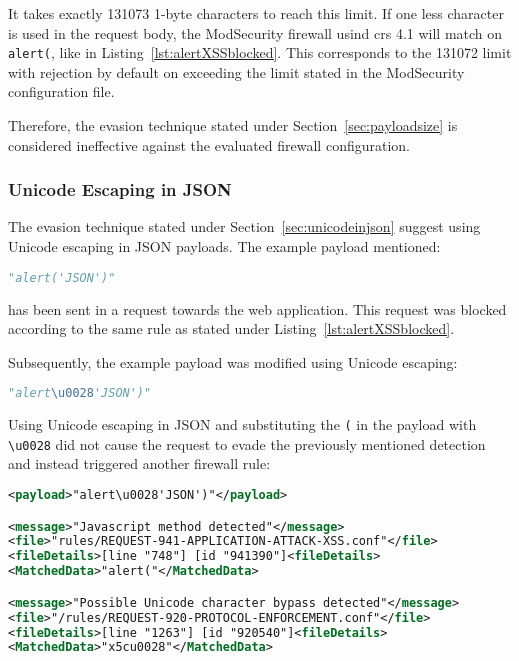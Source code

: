 It takes exactly 131073 1-byte characters to reach this limit. If one less character is used in the request body, the ModSecurity firewall usind \acrshort{crs} 4.1 will match on \verb|alert(|, like in Listing~\ref{lst:alertXSSblocked}. This corresponds to the 131072 limit with rejection by default on exceeding the limit stated in the ModSecurity configuration file.

Therefore, the evasion technique stated under Section~\ref{sec:payloadsize} is considered ineffective against the evaluated firewall configuration.


\subsubsection{Unicode Escaping in JSON}
\label{sec:unicodeinjsontest}
The evasion technique stated under Section~\ref{sec:unicodeinjson} suggest using Unicode escaping in JSON payloads. The example payload mentioned:

\begin{lstlisting}[style=basicStyle, language=Python]
"alert('JSON')"
\end{lstlisting}

has been sent in a request towards the web application. This request was blocked according to the same rule as stated under Listing~\ref{lst:alertXSSblocked}.

Subsequently, the example payload was modified using Unicode escaping:

\begin{lstlisting}[style=basicStyle, language=Python]
"alert\u0028'JSON')"
\end{lstlisting}

Using Unicode escaping in JSON and substituting the \verb|(| in the payload with \verb|\u0028| did not cause the request to evade the previously mentioned detection and instead triggered another firewall rule: 

\begin{lstlisting}[style=ruleStyle, language=XML, caption=Unicode escaping blocked, label={lst:jsonunicodeescblocked}]
<payload>"alert\u0028'JSON')"</payload>

<message>"Javascript method detected"</message>
<file>"rules/REQUEST-941-APPLICATION-ATTACK-XSS.conf"</file>
<fileDetails>[line "748"] [id "941390"]<fileDetails>
<MatchedData>"alert("</MatchedData>

<message>"Possible Unicode character bypass detected"</message>
<file>"/rules/REQUEST-920-PROTOCOL-ENFORCEMENT.conf"</file>
<fileDetails>[line "1263"] [id "920540"]<fileDetails>
<MatchedData>"x5cu0028"</MatchedData>
\end{lstlisting}


